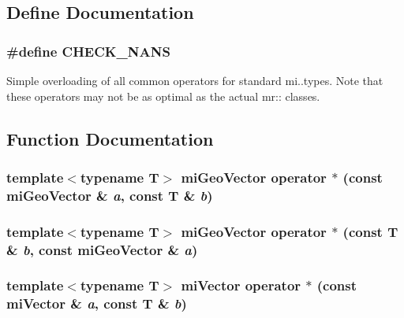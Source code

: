 \subsection{Define Documentation}
\subsubsection{\setlength{\rightskip}{0pt plus 5cm}\#define CHECK\_\-NANS}\label{mrOperators_8h_a0}


Simple overloading of all common operators for standard mi..types. Note that these operators may not be as optimal as the actual mr:: classes. 

\subsection{Function Documentation}
\subsubsection{\setlength{\rightskip}{0pt plus 5cm}template$<$typename T$>$ mi\-Geo\-Vector operator $\ast$ (const mi\-Geo\-Vector \& {\em a}, const T \& {\em b})\hspace{0.3cm}{\tt  [inline]}}\label{mrOperators_8h_a68}


\subsubsection{\setlength{\rightskip}{0pt plus 5cm}template$<$typename T$>$ mi\-Geo\-Vector operator $\ast$ (const T \& {\em b}, const mi\-Geo\-Vector \& {\em a})\hspace{0.3cm}{\tt  [inline]}}\label{mrOperators_8h_a67}


\subsubsection{\setlength{\rightskip}{0pt plus 5cm}template$<$typename T$>$ mi\-Vector operator $\ast$ (const mi\-Vector \& {\em a}, const T \& {\em b})\hspace{0.3cm}{\tt  [inline]}}\label{mrOperators_8h_a66}


